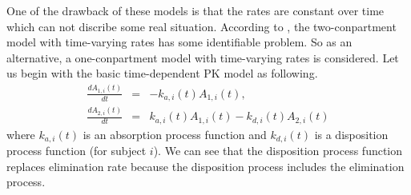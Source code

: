 \documentclass[12pt]{extarticle}
\begin{document}
One of the drawback of these models is that the rates are constant over time which can not discribe some real situation. According to \cite{Li02}, the two-conpartment model with time-varying rates has some identifiable problem. So as an alternative, a one-conpartment model with time-varying rates is considered. Let us begin with the basic time-dependent PK model as following.
\begin{equation}
\begin{array}{rcl}
\frac{dA_{1,i}(t)}{dt} & = & -k_{a,i}(t)A_{1,i}(t), \\
\frac{dA_{2,i}(t)}{dt} & = & k_{a,i}(t)A_{1,i}(t) - k_{d,i}(t)A_{2,i}(t)
\end{array}
\end{equation}
where $k_{a,i}(t)$ is an absorption process function and $k_{d,i}(t)$ is a disposition process function (for subject $i$). We can see that the disposition process function replaces elimination rate because the disposition process includes the elimination process. 
\end{document}
